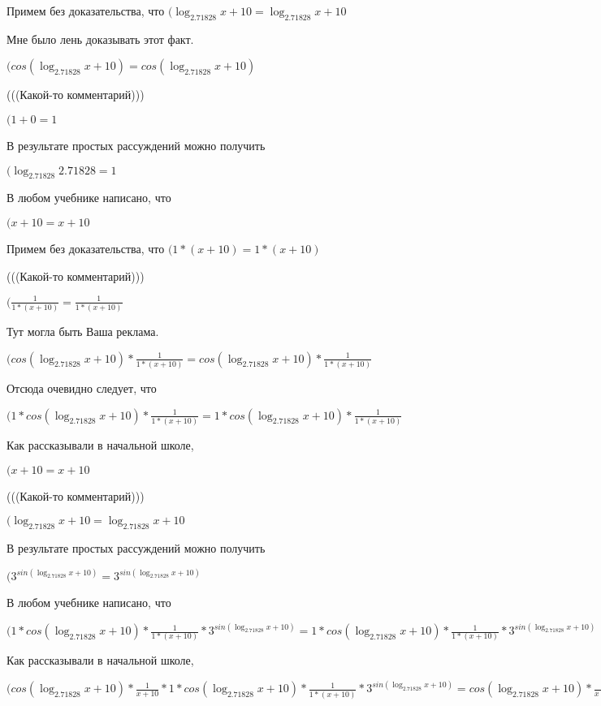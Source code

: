 \documentclass[12pt,a4paper,fleqn]{article}
\theoremstyle{definition}
\begin{document}
Примем без доказательства, что
$(\log_{ 2.71828 }{ x  +  10 } = \log_{ 2.71828 }{ x  +  10 }$

Мне было лень доказывать этот факт.

$(cos(\log_{ 2.71828 }{ x  +  10 }) = cos(\log_{ 2.71828 }{ x  +  10 })$

(((Какой-то комментарий)))

$( 1  +  0  =  1 $

В результате простых рассуждений можно получить

$(\log_{ 2.71828 }{ 2.71828 } =  1 $

В любом учебнике написано, что

$( x  +  10  =  x  +  10 $

Примем без доказательства, что
$( 1  * ( x  +  10 ) =  1  * ( x  +  10 )$

(((Какой-то комментарий)))

$(\frac{ 1 }{ 1  * ( x  +  10 )}
 = \frac{ 1 }{ 1  * ( x  +  10 )}
$

Тут могла быть Ваша реклама.

$(cos(\log_{ 2.71828 }{ x  +  10 }) * \frac{ 1 }{ 1  * ( x  +  10 )}
 = cos(\log_{ 2.71828 }{ x  +  10 }) * \frac{ 1 }{ 1  * ( x  +  10 )}
$

Отсюда очевидно следует, что

$( 1  * cos(\log_{ 2.71828 }{ x  +  10 }) * \frac{ 1 }{ 1  * ( x  +  10 )}
 =  1  * cos(\log_{ 2.71828 }{ x  +  10 }) * \frac{ 1 }{ 1  * ( x  +  10 )}
$

Как рассказывали в начальной школе,

$( x  +  10  =  x  +  10 $

(((Какой-то комментарий)))

$(\log_{ 2.71828 }{ x  +  10 } = \log_{ 2.71828 }{ x  +  10 }$

В результате простых рассуждений можно получить

$({ 3 }^{sin(\log_{ 2.71828 }{ x  +  10 })} = { 3 }^{sin(\log_{ 2.71828 }{ x  +  10 })}$

В любом учебнике написано, что

$( 1  * cos(\log_{ 2.71828 }{ x  +  10 }) * \frac{ 1 }{ 1  * ( x  +  10 )}
 * { 3 }^{sin(\log_{ 2.71828 }{ x  +  10 })} =  1  * cos(\log_{ 2.71828 }{ x  +  10 }) * \frac{ 1 }{ 1  * ( x  +  10 )}
 * { 3 }^{sin(\log_{ 2.71828 }{ x  +  10 })}$

Как рассказывали в начальной школе,

$(cos(\log_{ 2.71828 }{ x  +  10 }) * \frac{ 1 }{ x  +  10 }
 *  1  * cos(\log_{ 2.71828 }{ x  +  10 }) * \frac{ 1 }{ 1  * ( x  +  10 )}
 * { 3 }^{sin(\log_{ 2.71828 }{ x  +  10 })} = cos(\log_{ 2.71828 }{ x  +  10 }) * \frac{ 1 }{ x  +  10 }
 *  1  * cos(\log_{ 2.71828 }{ x  +  10 }) * \frac{ 1 }{ 1  * ( x  +  10 )}
 * { 3 }^{sin(\log_{ 2.71828 }{ x  +  10 })}$
\end{document}
